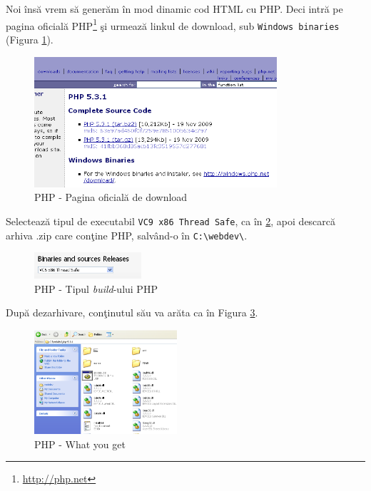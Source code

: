 Noi însă vrem să generăm în mod dinamic cod HTML cu PHP. Deci intră pe pagina oficială
PHP\footnote{\url{http://php.net}} şi urmează linkul de download,
sub \texttt{Windows binaries} (Figura \ref{fig:php win bin}).


\begin{figure}[h!]
  \centering
    \includegraphics[width=340px]{cap01/Screenshot-6.png}
  \caption{PHP - Pagina oficială de download}
  \label{fig:php win bin}
\end{figure}

Selectează tipul de executabil \texttt{VC9 x86 Thread Safe}, ca în \ref{fig:php build type}, apoi
descarcă arhiva .zip care conţine PHP, salvând-o în \texttt{C:{\textbackslash}webdev\textbackslash}.
\begin{figure}[h!]
  \centering
    \includegraphics[width=150px]{cap01/Screenshot-7.png}
  \caption{PHP - Tipul \textsl{build}-ului PHP}
  \label{fig:php build type}
\end{figure}



După dezarhivare, conţinutul său va arăta ca în Figura \ref{fig:php what you get}.

\begin{figure}[h!]
  \centering
    \includegraphics[width=200px]{cap01/Screenshot-9.png}
  \caption{PHP - What you get}
  \label{fig:php what you get}
\end{figure}

